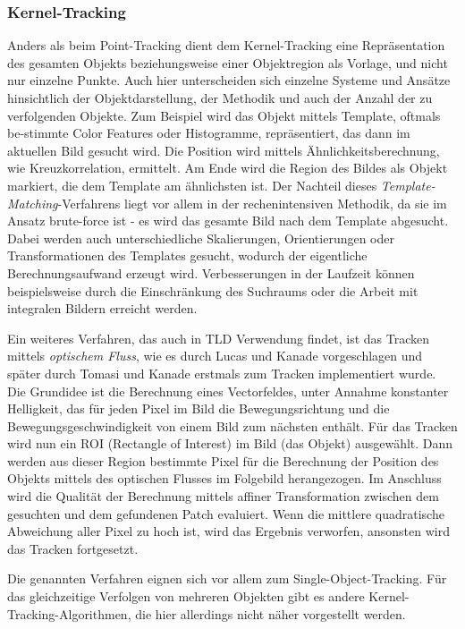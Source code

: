 \subsubsection{Kernel-Tracking}
Anders als beim Point-Tracking dient dem Kernel-Tracking eine Repräsentation des gesamten Objekts beziehungsweise einer Objektregion als Vorlage, und nicht nur einzelne Punkte. Auch hier unterscheiden sich einzelne Systeme und Ansätze hinsichtlich der Objektdarstellung, der Methodik und auch der Anzahl der zu verfolgenden Objekte. Zum Beispiel wird das Objekt mittels Template, oftmals be-stimmte Color Features oder Histogramme, repräsentiert, das dann im aktuellen Bild gesucht wird. Die Position wird mittels Ähnlichkeitsberechnung, wie Kreuzkorrelation, ermittelt. Am Ende wird die Region des Bildes als Objekt markiert, die dem Template am ähnlichsten ist. Der Nachteil dieses \textit{Template-Matching}-Verfahrens liegt vor allem in der rechenintensiven Methodik, da sie im Ansatz brute-force ist - es wird das gesamte Bild nach dem Template abgesucht. Dabei werden auch unterschiedliche Skalierungen, Orientierungen oder Transformationen des Templates gesucht, wodurch der eigentliche Berechnungsaufwand erzeugt wird. Verbesserungen in der Laufzeit können beispielsweise durch die Einschränkung des Suchraums oder die Arbeit mit integralen Bildern\cite{INT} erreicht werden.

Ein weiteres Verfahren, das auch in TLD Verwendung findet, ist das Tracken mittels \textit{optischem Fluss}, wie es durch Lucas und Kanade\cite{OPT} vorgeschlagen und später durch Tomasi und Kanade\cite{LKT} erstmals zum Tracken implementiert wurde. Die Grundidee ist die Berechnung eines Vectorfeldes, unter Annahme konstanter Helligkeit, das für jeden Pixel im Bild die Bewegungsrichtung und die Bewegungsgeschwindigkeit von einem Bild zum nächsten enthält. Für das Tracken wird nun ein ROI (Rectangle of Interest) im Bild (das Objekt) ausgewählt. Dann werden aus dieser Region bestimmte Pixel für die Berechnung der Position des Objekts mittels des optischen Flusses im Folgebild herangezogen. Im Anschluss wird die Qualität der Berechnung mittels affiner Transformation zwischen dem gesuchten und dem gefundenen Patch evaluiert. Wenn die mittlere quadratische Abweichung aller Pixel zu hoch ist, wird das Ergebnis verworfen, ansonsten wird das Tracken fortgesetzt.

Die genannten Verfahren eignen sich vor allem zum Single-Object-Tracking. Für das gleichzeitige Verfolgen von mehreren Objekten gibt es andere Kernel-Tracking-Algorithmen, die hier allerdings nicht näher vorgestellt werden.

